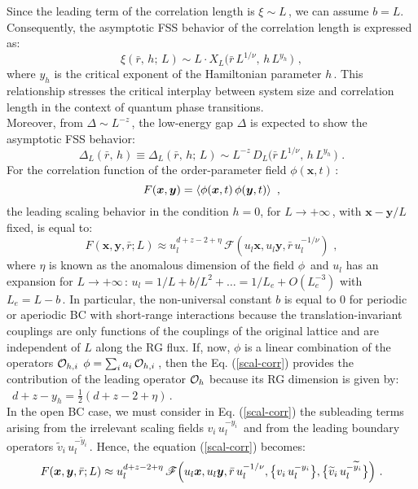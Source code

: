 Since the leading term of the correlation length is $\xi \sim L\,$, we can assume $b=L$. Consequently, the asymptotic FSS behavior of the correlation length is expressed as:
\begin{equation}
\label{xifsscqt1}
\xi(\bar r, \, h ;\,L) \sim
L \cdot X_L\bigl( 
\bar r\,L^{1/\nu} ,\,h\,L^{y_h} \,    \bigl) \,\, ,
\end{equation}
where $y_h$ is the critical exponent of the Hamiltonian parameter $h\,$. This relationship stresses the critical interplay between system size and correlation length in the context of quantum phase transitions.\\
Moreover, from $\Delta \sim L^{-z}\,$, the low-energy gap $\Delta$ is expected to show the asymptotic FSS behavior:
\begin{equation}
\label{deltafsscqt}
\Delta _L(\bar r, \, h) \equiv \Delta _L(\bar r, \, h;\,L) \sim
L^{-z} \, D_L\bigl( 
\bar r\,L^{1/\nu} ,\,h\,L^{y_h} \,    \bigl) \,\, .
\end{equation}
$ $\\
For the correlation function of the order-parameter field $\phi(\bm x, t)\,$:
\begin{equation}
\label{corr-ord}
F(\bm x, \bm y) = \braket{\phi(\bm x,t)\,\phi(\bm y,t)}
\,\, ,
\end{equation}
the leading scaling behavior in the condition $h=0$, for $L\to +\infty\,$, with $\bm x- \bm y/L$ fixed,  is equal to:
\begin{equation}
\label{scal-corr}
F(\bm x, \bm y, \bar r;L) \approx u_l^{d+z-2+\eta} \, \mathscr{F}(u_l\bm x ,u_l\bm y, \bar r\,u_l^{-1/\nu})
\,\, ,
\end{equation}
where $\eta$ is known as the anomalous dimension of the field $\phi\,$ and $u_l$ has an expansion for $L\to +\infty\,$: $u_l = 1/L + b/L^2 + \dots = 1/L_e + O(L_e^{-3})$ with $L_e = L-b\,$. In particular, the non-universal constant $b$ is equal to $0$ for periodic or aperiodic BC with short-range interactions because the translation-invariant couplings are only functions of the couplings of the original lattice and are independent of $L$ along the RG flux. If, now, $\phi$ is a linear combination of the operators ${\cal O}_{h,i}$ $\phi = \sum _i a_i\,{\cal O}_{h,i}\,$, 
then the Eq. (\ref{scal-corr}) provides the contribution of the leading operator ${\cal O}_h$ because its RG dimension is given by: $\,\,\, d + z - y_h = \frac{1}{2}\left(d+z-2+\eta\right)\,$.\\
In the open BC case, we must consider in Eq. (\ref{scal-corr}) the subleading terms arising from the irrelevant scaling fields $v_i\,u_l^{-y_i}\,$ and from the leading boundary operators $\widetilde{v}_i\,u_l^{-\widetilde{y}_i}\,$. Hence, the equation (\ref{scal-corr}) becomes:
\begin{equation}%
\label{scal-corr1}
F(\bm x, \bm y, \bar r;L) \approx u_l^{d+z-2+\eta} \,\mathscr{F}\Bigl(u_l\bm x ,u_l\bm y, \bar r\,u_l^{-1/\nu}, \bigl\{v_i\,u_l^{-y_i}\bigl\},  \bigl\{\widetilde{v}_i\,u_l^{-\widetilde{y}_i}\bigl\}  \Bigl)
\,\, .
\end{equation}


